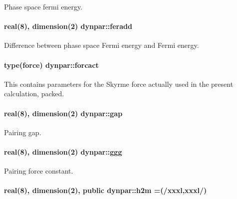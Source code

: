 Phase space fermi energy. 

\paragraph[{\texorpdfstring{feradd}{feradd}}]{\setlength{\rightskip}{0pt plus 5cm}real(8), dimension(2) dynpar\+::feradd}\hypertarget{namespacedynpar_af4ed4af756b4cf0507655adc548a0439}{}\label{namespacedynpar_af4ed4af756b4cf0507655adc548a0439}


Difference between phase space Fermi energy and Fermi energy. 

\paragraph[{\texorpdfstring{forcact}{forcact}}]{\setlength{\rightskip}{0pt plus 5cm}type({\bf force}) dynpar\+::forcact}\hypertarget{namespacedynpar_a3e425cbc7896d63e7533e2c878976405}{}\label{namespacedynpar_a3e425cbc7896d63e7533e2c878976405}


This contains parameters for the Skyrme force actually used in the present calculation, packed. 

\paragraph[{\texorpdfstring{gap}{gap}}]{\setlength{\rightskip}{0pt plus 5cm}real(8), dimension(2) dynpar\+::gap}\hypertarget{namespacedynpar_a35d2d18fbc60955048c9bd94d877fe33}{}\label{namespacedynpar_a35d2d18fbc60955048c9bd94d877fe33}


Pairing gap. 

\paragraph[{\texorpdfstring{ggg}{ggg}}]{\setlength{\rightskip}{0pt plus 5cm}real(8), dimension(2) dynpar\+::ggg}\hypertarget{namespacedynpar_a853bf04735807d2246a44c27a2cc0525}{}\label{namespacedynpar_a853bf04735807d2246a44c27a2cc0525}


Pairing force constant. 

\paragraph[{\texorpdfstring{h2m}{h2m}}]{\setlength{\rightskip}{0pt plus 5cm}real(8), dimension(2), public dynpar\+::h2m =(/xxxl,xxxl/)}\hypertarget{namespacedynpar_a78acc8d97e315a306429696f781455ad}{}\label{namespacedynpar_a78acc8d97e315a306429696f781455ad}



